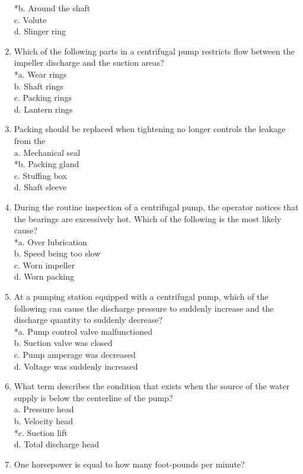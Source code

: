 \begin{enumerate}[1.]
*b. Around the shaft\\
c. Volute\\
d. Slinger ring\\
\item Which of the following parts in a centrifugal pump restricts flow between the impeller discharge and the suction areas?\\
*a. Wear rings\\
b. Shaft rings\\
c. Packing rings\\
d. Lantern rings\\
\item Packing should be replaced when tightening no longer controls the leakage from the\\
a. Mechanical seal\\
*b. Packing gland\\
c. Stuffing box\\
d. Shaft sleeve\\
\item During the routine inspection of a centrifugal pump, the operator notices that the bearings are excessively hot. Which of the following is the most likely cause?\\
*a. Over lubrication\\
b. Speed being too slow\\
c. Worn impeller\\
d. Worn packing\\
\item At a pumping station equipped with a centrifugal pump, which of the following can cause the discharge pressure to suddenly increase and the discharge quantity to suddenly decrease?\\
*a. Pump control valve malfunctioned\\
b. Suction valve was closed\\
c. Pump amperage was decreased\\
d. Voltage was suddenly increased\\
\item What term describes the condition that exists when the source of the water supply is below the centerline of the pump?\\
a. Pressure head\\
b. Velocity head\\
*c. Suction lift\\
d. Total discharge head\\
\item One horsepower is equal to how many foot-pounds per minute?\\

\end{enumerate}

